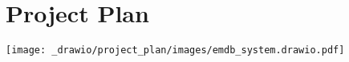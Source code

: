 \chapter{Project Plan}
\begin{center}
    \texttt{[image: \_drawio/project\_plan/images/emdb\_system.drawio.pdf]}
\end{center}